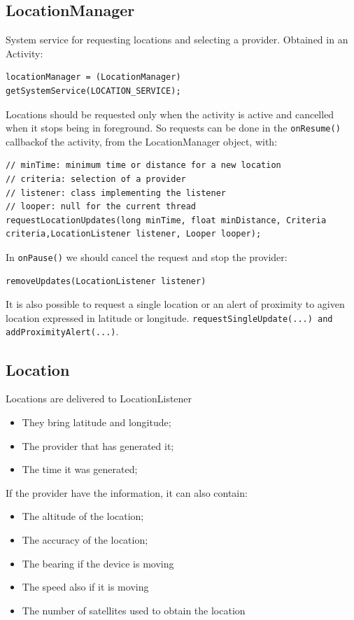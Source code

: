 \subsection{LocationManager}

System service for requesting locations and selecting a provider. 
Obtained in an Activity: 

\begin{lstlisting}
locationManager = (LocationManager) getSystemService(LOCATION_SERVICE);
\end{lstlisting}

Locations should be requested only when the activity is active and cancelled 
when it stops being in foreground.
So requests can be done in the \texttt{onResume()} callbackof the activity, 
from the LocationManager object, with:

\begin{lstlisting}
// minTime: minimum time or distance for a new location
// criteria: selection of a provider 
// listener: class implementing the listener
// looper: null for the current thread
requestLocationUpdates(long minTime, float minDistance, Criteria criteria,LocationListener listener, Looper looper); 
\end{lstlisting}

In \texttt{onPause()} we should cancel the request and stop the provider:

\begin{lstlisting}
removeUpdates(LocationListener listener) 
\end{lstlisting}


It is also possible to request a single location or an alert of proximity to agiven location expressed in latitude or longitude.
\texttt{requestSingleUpdate(...) and addProximityAlert(...)}. 

\subsection{Location}
Locations are delivered to LocationListener 

\begin{itemize}
    \item They bring latitude and longitude;
    \item The provider that has generated it;
    \item The time it was generated;

\end{itemize} 

If the provider have the information, it can also contain: 
\begin{itemize}
    \item The altitude of the location;
    \item The accuracy of the location;  
    \item The bearing if the device is moving
    \item The speed also if it is moving
    \item The number of satellites used to obtain the location
\end{itemize} 

